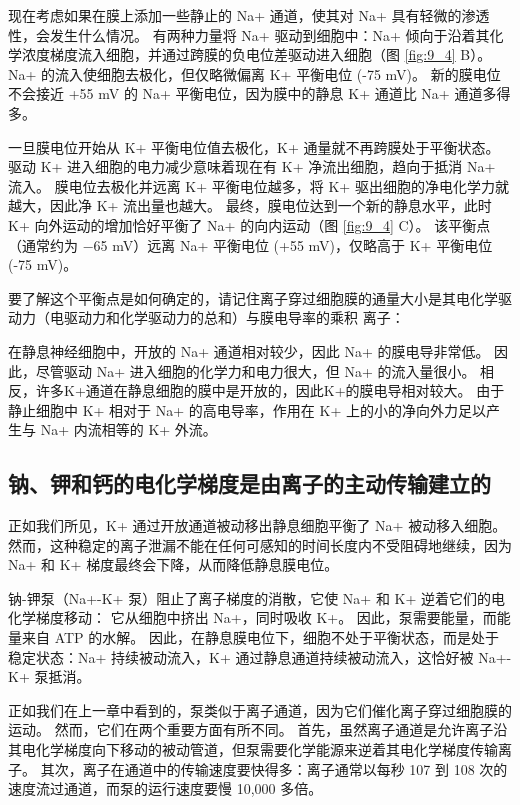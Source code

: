 现在考虑如果在膜上添加一些静止的 Na+ 通道，使其对 Na+ 具有轻微的渗透性，会发生什么情况。 
有两种力量将 Na+ 驱动到细胞中：Na+ 倾向于沿着其化学浓度梯度流入细胞，并通过跨膜的负电位差驱动进入细胞（图 \ref{fig:9_4} B）。 
Na+ 的流入使细胞去极化，但仅略微偏离 K+ 平衡电位 (-75 mV)。 
新的膜电位不会接近 +55 mV 的 Na+ 平衡电位，因为膜中的静息 K+ 通道比 Na+ 通道多得多。


一旦膜电位开始从 K+ 平衡电位值去极化，K+ 通量就不再跨膜处于平衡状态。 
驱动 K+ 进入细胞的电力减少意味着现在有 K+ 净流出细胞，趋向于抵消 Na+ 流入。 
膜电位去极化并远离 K+ 平衡电位越多，将 K+ 驱出细胞的净电化学力就越大，因此净 K+ 流出量也越大。 最终，膜电位达到一个新的静息水平，此时 K+ 向外运动的增加恰好平衡了 Na+ 的向内运动（图 \ref{fig:9_4} C）。 
该平衡点（通常约为 −65 mV）远离 Na+ 平衡电位 (+55 mV)，仅略高于 K+ 平衡电位 (-75 mV)。


要了解这个平衡点是如何确定的，请记住离子穿过细胞膜的通量大小是其电化学驱动力（电驱动力和化学驱动力的总和）与膜电导率的乘积 离子：


在静息神经细胞中，开放的 Na+ 通道相对较少，因此 Na+ 的膜电导非常低。 
因此，尽管驱动 Na+ 进入细胞的化学力和电力很大，但 Na+ 的流入量很小。 
相反，许多K+通道在静息细胞的膜中是开放的，因此K+的膜电导相对较大。 
由于静止细胞中 K+ 相对于 Na+ 的高电导率，作用在 K+ 上的小的净向外力足以产生与 Na+ 内流相等的 K+ 外流。



\subsection{钠、钾和钙的电化学梯度是由离子的主动传输建立的}
正如我们所见，K+ 通过开放通道被动移出静息细胞平衡了 Na+ 被动移入细胞。 
然而，这种稳定的离子泄漏不能在任何可感知的时间长度内不受阻碍地继续，因为 Na+ 和 K+ 梯度最终会下降，从而降低静息膜电位。


钠-钾泵（Na+-K+ 泵）阻止了离子梯度的消散，它使 Na+ 和 K+ 逆着它们的电化学梯度移动：
它从细胞中挤出 Na+，同时吸收 K+。 
因此，泵需要能量，而能量来自 ATP 的水解。 
因此，在静息膜电位下，细胞不处于平衡状态，而是处于稳定状态：Na+ 持续被动流入，K+ 通过静息通道持续被动流入，这恰好被 Na+-K+ 泵抵消。


正如我们在上一章中看到的，泵类似于离子通道，因为它们催化离子穿过细胞膜的运动。 
然而，它们在两个重要方面有所不同。 
首先，虽然离子通道是允许离子沿其电化学梯度向下移动的被动管道，但泵需要化学能源来逆着其电化学梯度传输离子。 
其次，离子在通道中的传输速度要快得多：离子通常以每秒 107 到 108 次的速度流过通道，而泵的运行速度要慢 10,000 多倍。


